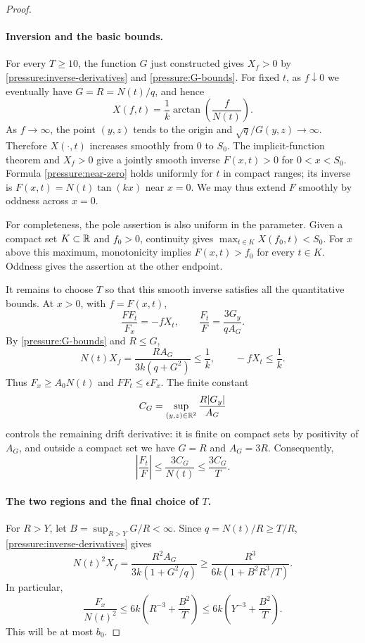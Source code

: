 \begin{proof}
\paragraph{Inversion and the basic bounds.}
For every \(T\ge10\), the function \(G\) just constructed gives
\(X_f>0\) by \eqref{pressure:inverse-derivatives} and
\eqref{pressure:G-bounds}.
For fixed \(t\), as \(f\downarrow0\) we eventually have \(G=R=N(t)/q\),
and hence
\begin{equation}\label{pressure:near-zero}
 X(f,t)=\frac1k\arctan\!\left(\frac f{N(t)}\right).
\end{equation}
As \(f\to\infty\), the point \((y,z)\) tends to the origin and
\(\sqrt q/G(y,z)\to\infty\).  Therefore \(X(\cdot,t)\) increases
smoothly from \(0\) to \(S_0\).  The implicit-function theorem and
\(X_f>0\) give a jointly smooth inverse \(F(x,t)>0\) for
\(0<x<S_0\).  Formula
\eqref{pressure:near-zero} holds uniformly for \(t\) in compact ranges;
its inverse is \(F(x,t)=N(t)\tan(kx)\) near \(x=0\).
We may thus extend \(F\) smoothly by oddness across \(x=0\).

For completeness, the pole assertion is also uniform in the parameter.
Given a compact set \(K\subset\mathbb R\) and \(f_0>0\), continuity gives
\(\max_{t\in K}X(f_0,t)<S_0\).  For \(x\) above this maximum,
monotonicity implies \(F(x,t)>f_0\) for every \(t\in K\).
Oddness gives the assertion at the other endpoint.

It remains to choose \(T\) so that this smooth inverse satisfies all the
quantitative bounds.  At \(x>0\), with \(f=F(x,t)\),
\begin{equation}\label{pressure:implicit-derivatives}
 \frac{FF_t}{F_x}=-fX_t,\qquad
 \frac{F_t}{F}=\frac{3G_y}{qA_G}.
\end{equation}
By \eqref{pressure:G-bounds} and \(R\le G\),
\[
 N(t)X_f=\frac{RA_G}{3k(q+G^2)}\le\frac1k,
 \qquad -fX_t\le\frac1k.
\]
Thus \(F_x\ge A_0N(t)\) and \(FF_t\le\epsilon F_x\).
The finite constant
\[
 C_G=\sup_{(y,z)\in\mathbb R^2}\frac{R|G_y|}{A_G}
\]
controls the remaining drift derivative: it is finite on compact sets by
positivity of \(A_G\), and outside a compact set we have \(G=R\) and
\(A_G=3R\).  Consequently,
\begin{equation}\label{pressure:t-derivative}
 \left|\frac{F_t}{F}\right|
 \le\frac{3C_G}{N(t)}\le\frac{3C_G}{T}.
\end{equation}

\paragraph{The two regions and the final choice of \(T\).}
For \(R>Y\), let \(B=\sup_{R>Y}G/R<\infty\).  Since \(q=N(t)/R\ge T/R\),
\eqref{pressure:inverse-derivatives} gives
\[
 N(t)^2X_f
 =\frac{R^2A_G}{3k(1+G^2/q)}
 \ge\frac{R^3}{6k(1+B^2R^3/T)}.
\]
In particular,
\begin{equation}\label{pressure:outer-bound}
 \frac{F_x}{N(t)^2}
 \le6k\left(R^{-3}+\frac{B^2}{T}\right)
 \le6k\left(Y^{-3}+\frac{B^2}{T}\right).
\end{equation}
This will be at most \(b_0\).


\end{proof}
